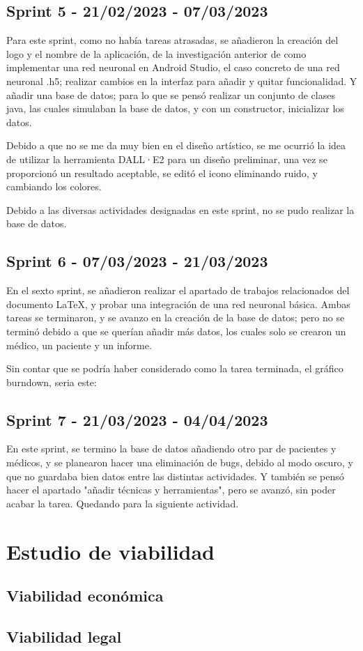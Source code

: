 \subsection{Sprint 5 - 21/02/2023 - 07/03/2023}
Para este sprint, como no había tareas atrasadas, se añadieron la creación del logo y el nombre de la aplicación, de la investigación anterior de como implementar una red neuronal en Android Studio, el caso concreto de una red neuronal .h5; realizar cambios en la interfaz para añadir y quitar funcionalidad. Y añadir una base de datos; para lo que se pensó realizar un conjunto de clases java, las cuales simulaban la base de datos, y con un constructor, inicializar los datos.

Debido a que no se me da muy bien en el diseño artístico, se me ocurrió la idea de utilizar la herramienta DALL·E2 para un diseño preliminar, una vez se proporcionó un resultado aceptable, se editó el icono eliminando ruido, y cambiando los colores.

Debido a las diversas actividades designadas en este sprint, no se pudo realizar la base de datos.

\subsection{Sprint 6 - 07/03/2023 - 21/03/2023}
En el sexto sprint, se añadieron realizar el apartado de trabajos relacionados del documento LaTeX, y probar una integración de una red neuronal básica.
Ambas tareas se terminaron, y se avanzo en la creación de la base de datos; pero no se terminó debido a que se querían añadir más datos, los cuales solo se crearon un médico, un paciente y un informe.

Sin contar que se podría haber considerado como la tarea terminada, el gráfico burndown, seria este:

\subsection{Sprint 7 - 21/03/2023 - 04/04/2023}
En este sprint, se termino la base de datos añadiendo otro par de pacientes y médicos, y se planearon hacer una eliminación de bugs, debido al modo oscuro, y que no guardaba bien datos entre las distintas actividades. Y también se pensó hacer el apartado "añadir técnicas y herramientas", pero se avanzó, sin poder acabar la tarea. Quedando para la siguiente actividad.




\section{Estudio de viabilidad}

\subsection{Viabilidad económica}

\subsection{Viabilidad legal}


